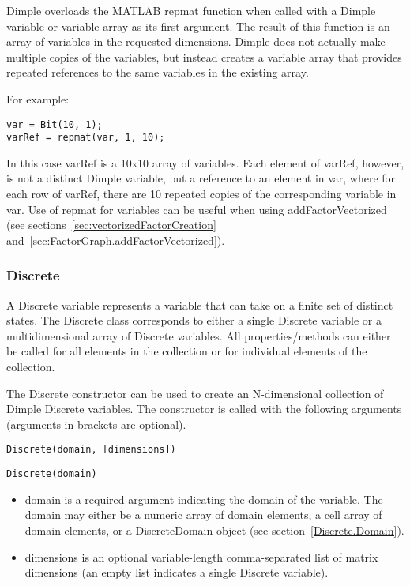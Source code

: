 
Dimple overloads the MATLAB repmat function when called with a Dimple variable or variable array as its first argument.  The result of this function is an array of variables in the requested dimensions.  Dimple does not actually make multiple copies of the variables, but instead creates a variable array that provides repeated references to the same variables in the existing array.  

For example:
\begin{lstlisting}
var = Bit(10, 1);
varRef = repmat(var, 1, 10);
\end{lstlisting}

In this case varRef is a 10x10 array of variables.  Each element of varRef, however, is not a distinct Dimple variable, but a reference to an element in var, where for each row of varRef, there are 10 repeated copies of the corresponding variable in var.  Use of repmat for variables can be useful when using addFactorVectorized (see sections~\ref{sec:vectorizedFactorCreation} and~\ref{sec:FactorGraph.addFactorVectorized}).

\fi

\subsubsection{Discrete}
\label{sec:Discrete}

A Discrete variable represents a variable that can take on a finite set of distinct states.  The Discrete class corresponds to either a single Discrete variable or a multidimensional array of Discrete variables.  All properties/methods can either be called for all elements in the collection or for individual elements of the collection.


The Discrete constructor can be used to create an N-dimensional collection of Dimple Discrete variables.  The constructor is called with the following arguments (arguments in brackets are optional).

\ifmatlab
\begin{lstlisting}
Discrete(domain, [dimensions])
\end{lstlisting}
\fi

\ifjava
\begin{lstlisting}
Discrete(domain)
\end{lstlisting}
\fi

\ifmatlab
\begin{itemize}
\item domain is a required argument indicating the domain of the variable.  The domain may either be a numeric array of domain elements, a cell array of domain elements, or a DiscreteDomain object (see section~\ref{Discrete.Domain}).
\item dimensions is an optional variable-length comma-separated list of matrix dimensions (an empty list indicates a single Discrete variable).
\end{itemize}
\fi

